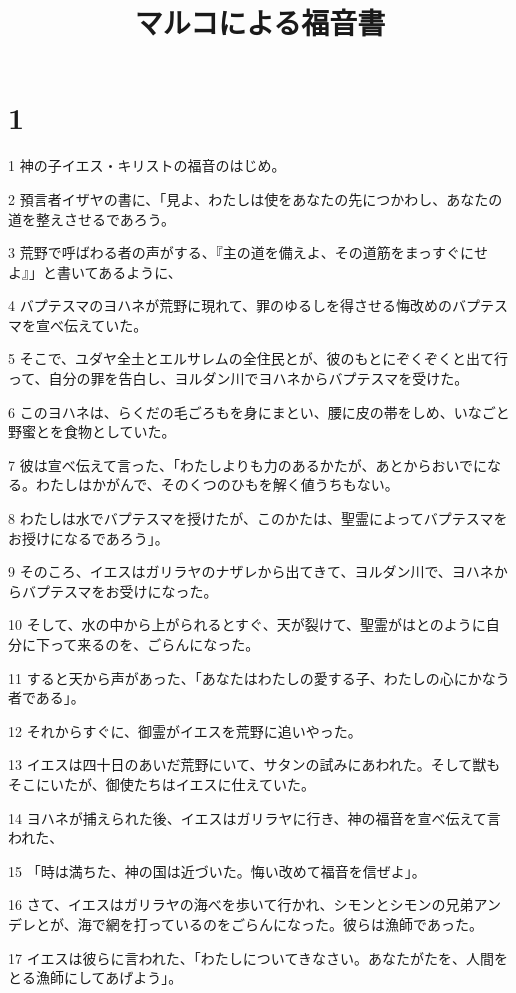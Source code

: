 

\title{マルコによる福音書}


\chapter{1}

\par 1 神の子イエス・キリストの福音のはじめ。
\par 2 預言者イザヤの書に、「見よ、わたしは使をあなたの先につかわし、あなたの道を整えさせるであろう。
\par 3 荒野で呼ばわる者の声がする、『主の道を備えよ、その道筋をまっすぐにせよ』」と書いてあるように、
\par 4 バプテスマのヨハネが荒野に現れて、罪のゆるしを得させる悔改めのバプテスマを宣べ伝えていた。
\par 5 そこで、ユダヤ全土とエルサレムの全住民とが、彼のもとにぞくぞくと出て行って、自分の罪を告白し、ヨルダン川でヨハネからバプテスマを受けた。
\par 6 このヨハネは、らくだの毛ごろもを身にまとい、腰に皮の帯をしめ、いなごと野蜜とを食物としていた。
\par 7 彼は宣べ伝えて言った、「わたしよりも力のあるかたが、あとからおいでになる。わたしはかがんで、そのくつのひもを解く値うちもない。
\par 8 わたしは水でバプテスマを授けたが、このかたは、聖霊によってバプテスマをお授けになるであろう」。
\par 9 そのころ、イエスはガリラヤのナザレから出てきて、ヨルダン川で、ヨハネからバプテスマをお受けになった。
\par 10 そして、水の中から上がられるとすぐ、天が裂けて、聖霊がはとのように自分に下って来るのを、ごらんになった。
\par 11 すると天から声があった、「あなたはわたしの愛する子、わたしの心にかなう者である」。
\par 12 それからすぐに、御霊がイエスを荒野に追いやった。
\par 13 イエスは四十日のあいだ荒野にいて、サタンの試みにあわれた。そして獣もそこにいたが、御使たちはイエスに仕えていた。
\par 14 ヨハネが捕えられた後、イエスはガリラヤに行き、神の福音を宣べ伝えて言われた、
\par 15 「時は満ちた、神の国は近づいた。悔い改めて福音を信ぜよ」。
\par 16 さて、イエスはガリラヤの海べを歩いて行かれ、シモンとシモンの兄弟アンデレとが、海で網を打っているのをごらんになった。彼らは漁師であった。
\par 17 イエスは彼らに言われた、「わたしについてきなさい。あなたがたを、人間をとる漁師にしてあげよう」。
